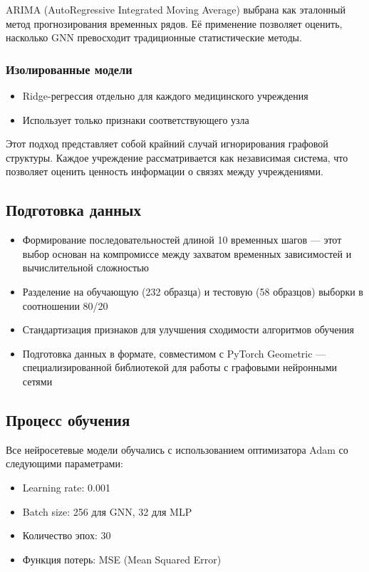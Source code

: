 \documentclass[12pt,a4paper]{article}
\begin{document}
	ARIMA (AutoRegressive Integrated Moving Average) выбрана как эталонный метод прогнозирования временных рядов. Её применение позволяет оценить, насколько GNN превосходит традиционные статистические методы.
	
	\subsubsection*{Изолированные модели}
	\begin{itemize}
		\item Ridge-регрессия отдельно для каждого медицинского учреждения
		\item Использует только признаки соответствующего узла
	\end{itemize}
	
	Этот подход представляет собой крайний случай игнорирования графовой структуры. Каждое учреждение рассматривается как независимая система, что позволяет оценить ценность информации о связях между учреждениями.
	
	\subsection{Подготовка данных}
	\begin{itemize}
		\item Формирование последовательностей длиной 10 временных шагов — этот выбор основан на компромиссе между захватом временных зависимостей и вычислительной сложностью
		\item Разделение на обучающую (232 образца) и тестовую (58 образцов) выборки в соотношении 80/20
		\item Стандартизация признаков для улучшения сходимости алгоритмов обучения
		\item Подготовка данных в формате, совместимом с PyTorch Geometric — специализированной библиотекой для работы с графовыми нейронными сетями
	\end{itemize}
	
	\subsection{Процесс обучения}
	Все нейросетевые модели обучались с использованием оптимизатора Adam со следующими параметрами:
	\begin{itemize}
		\item Learning rate: 0.001
		\item Batch size: 256 для GNN, 32 для MLP
		\item Количество эпох: 30
		\item Функция потерь: MSE (Mean Squared Error)
	\end{itemize}
	
\end{document}
